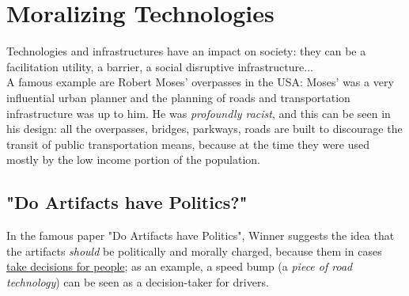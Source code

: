 \documentclass{article}
\begin{document}
	\section{Moralizing Technologies}
		Technologies and infrastructures have an impact on society: they can be a facilitation utility, a barrier, a social disruptive infrastructure...\\
		A famous example are Robert Moses' overpasses in the USA: Moses' was a very influential urban planner and the planning of roads and transportation infrastructure was up to him. He was \textit{profoundly racist}, and this can be seen in his design: all the overpasses, bridges, parkways, roads are built to discourage the transit of public transportation means, because at the time they were used mostly by the low income portion of the population.

		\subsection{"Do Artifacts have Politics?"}
			In the famous paper "Do Artifacts have Politics", Winner suggests the idea that the artifacts \textit{should} be politically and morally charged, because them in cases \underline{take decisions for people}; as an example, a speed bump (a \textit{piece of road technology}) can be seen as a decision-taker for drivers.
\end{document}
